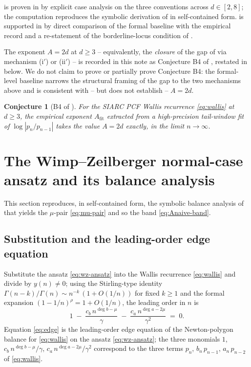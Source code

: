 \documentclass[11pt,reqno]{amsart}
\theoremstyle{plain}
\newtheorem{conjecture}[theorem]{Conjecture}
\theoremstyle{definition}
\theoremstyle{remark}
\newcommand{\Afit}{A_{\mathrm{fit}}}
\newcommand{\dega}{\deg a}
\newcommand{\degb}{\deg b}
\begin{document}
 is proven in  by explicit
case analysis on the three conventions across $d \in [2, 8]$;
the computation reproduces the symbolic derivation of
\cite[Phase~A]{siarc_t1_phase2} in self-contained form.
 is supported in  by
direct comparison of the formal baseline with the
\cite{papanokechi_pcf2_v13} empirical record and a re-statement
of the borderline-locus condition of
\cite[\S5]{wimp1984computation}.

The exponent $A = 2d$ at $d \ge 3$ -- equivalently, the
\emph{closure} of the gap of  via
mechanism \textup{(i$'$)} or \textup{(ii$'$)} -- is recorded
in this note as Conjecture B4 of \cite{papanokechi_pcf2_v13},
restated in  below. We do not claim to prove or
partially prove Conjecture B4: the formal-level baseline
 narrows the structural framing of the gap
to the two mechanisms above and is consistent with -- but does
not establish -- $A = 2d$.

\begin{conjecture}[B4 of \cite{papanokechi_pcf2_v13}]
\label{conj:b4}
For the SIARC PCF Wallis recurrence \eqref{eq:wallis} at
$d \ge 3$, the empirical exponent $\Afit$ extracted from a
high-precision tail-window fit of $\log|p_n / p_{n-1}|$ takes
the value $A = 2d$ exactly, in the limit $n \to \infty$.
\end{conjecture}

\section{The Wimp--Zeilberger normal-case ansatz and its
         balance analysis}
\label{sec:wz-balance}

This section reproduces, in self-contained form, the
symbolic balance analysis of \cite[Phase~A]{siarc_t1_phase2}
that yields the $\mu$-pair \eqref{eq:mu-pair} and so the
band \eqref{eq:Anaive-band}.

\subsection{Substitution and the leading-order edge equation}
\label{sec:wz-edge}
Substitute the ansatz \eqref{eq:wz-ansatz} into the Wallis
recurrence \eqref{eq:wallis} and divide by $y(n) \ne 0$; using
the Stirling-type identity
$\Gamma(n-k)/\Gamma(n) \sim n^{-k}\,(1 + O(1/n))$ for fixed
$k \ge 1$ and the formal expansion
$(1 - 1/n)^{\rho} = 1 + O(1/n)$, the leading order in $n$ is
\begin{equation}
\label{eq:edge}
  1 \;-\; \frac{c_b\,n^{\degb - \mu}}{\gamma}
  \;-\; \frac{c_a\,n^{\dega - 2\mu}}{\gamma^{2}} \;=\; 0.
\end{equation}
Equation \eqref{eq:edge} is the leading-order edge equation
of the Newton-polygon balance for \eqref{eq:wallis} on the
ansatz \eqref{eq:wz-ansatz}; the three monomials $1$,
$c_b\,n^{\degb - \mu}/\gamma$, $c_a\,n^{\dega - 2\mu}/\gamma^{2}$
correspond to the three terms $p_n$, $b_n\,p_{n-1}$,
$a_n\,p_{n-2}$ of \eqref{eq:wallis}.
\end{document}
